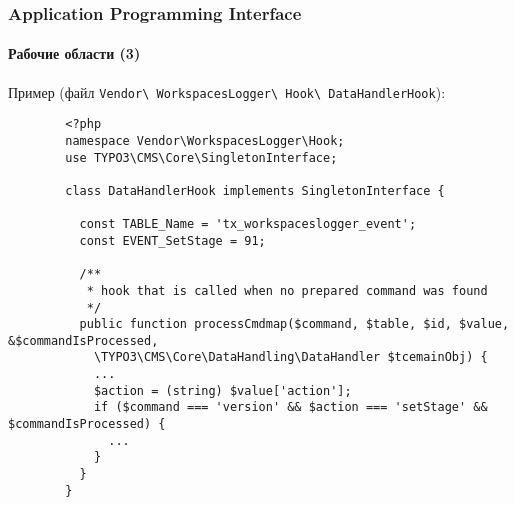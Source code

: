 
\begin{frame}[fragile]
	\frametitle{Application Programming Interface}
	\framesubtitle{Рабочие области (3)}

	Пример (файл \texttt{Vendor\textbackslash
		WorkspacesLogger\textbackslash
		Hook\textbackslash
		DataHandlerHook}):

	\lstset{
		basicstyle=\tiny\ttfamily
	}

	\begin{lstlisting}
		<?php
		namespace Vendor\WorkspacesLogger\Hook;
		use TYPO3\CMS\Core\SingletonInterface;

		class DataHandlerHook implements SingletonInterface {

		  const TABLE_Name = 'tx_workspaceslogger_event';
		  const EVENT_SetStage = 91;

		  /**
		   * hook that is called when no prepared command was found
		   */
		  public function processCmdmap($command, $table, $id, $value, &$commandIsProcessed,
		    \TYPO3\CMS\Core\DataHandling\DataHandler $tcemainObj) {
		    ...
		    $action = (string) $value['action'];
		    if ($command === 'version' && $action === 'setStage' && $commandIsProcessed) {
		      ...
		    }
		  }
		}
	\end{lstlisting}

\end{frame}


